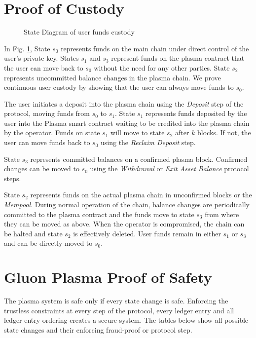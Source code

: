 \documentclass[12pt,a4paper]{article}
\begin{document}
\section{Proof of Custody}
\begin{figure}[ht]
    \centering

    \caption{State Diagram of user funds custody}
    \label{fig:custodystate}
\end{figure}

In Fig. \ref{fig:custodystate}, State $s_0$ represents funds on the main chain under direct control of the user's private key. States $s_1$ and $s_3$ represent funds on the plasma contract that the user can move back to $s_0$ without the need for any other parties. State $s_2$ represents uncommitted balance changes in the plasma chain. We prove continuous user custody by showing that the user can always move funds to $s_0$. 

The user initiates a deposit into the plasma chain using the \emph{Deposit} step of the protocol, moving funds from $s_0$ to $s_1$. State $s_1$ represents funds deposited by the user into the Plasma smart contract waiting to be credited into the plasma chain by the operator. Funds on state $s_1$ will move to state $s_2$ after $k$ blocks. If not, the user can move funds back to $s_0$ using the \emph{Reclaim Deposit} step.

State $s_3$ represents committed balances on a confirmed plasma block. Confirmed changes can be moved to $s_0$ using the \emph{Withdrawal} or \emph{Exit Asset Balance} protocol steps.

State $s_2$ represents funds on the actual plasma chain in unconfirmed blocks or the \emph{Mempool}. During normal operation of the chain, balance changes are periodically committed to the plasma contract and the funds move to state $s_3$ from where they can be moved as above. When the operator is compromised, the chain can be halted and state $s_2$ is effectively deleted. User funds remain in either $s_1$ or $s_3$ and can be directly moved to $s_0$. 


\newpage
\section{Gluon Plasma Proof of Safety}

The plasma system is safe only if every state change is safe. Enforcing the trustless constraints at every step of the protocol, every ledger entry and all ledger entry ordering creates a secure system. The tables below show all possible state changes and their enforcing fraud-proof or protocol step.
\end{document}
